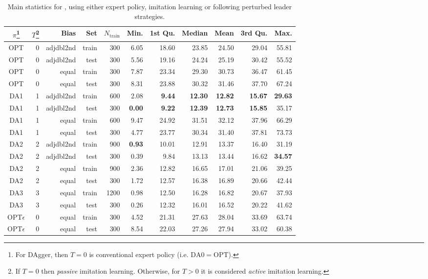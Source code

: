 \begin{table}[t]
\caption{Main statistics for  \namerho, using either expert
   policy, imitation learning or following perturbed leader 
   strategies.}\label{tbl:IL:stats} 
\noindent
\begin{minipage}{\textwidth}
\centering
\footnotesize
\begin{tabular}{c@{}rrrrrrrrrr}
  \toprule
  $\pi$\footnote{For DAgger, then $T=0$ is conventional expert policy (i.e. 
  $\text{DA}0=\text{OPT}$).}
  & $T$\footnote{If $T=0$ then \emph{passive} imitation learning. 
  Otherwise, for $T>0$ it is considered \emph{active} imitation learning.}
  & Bias & Set & $N_{\text{train}}$ & Min. & 1st Qu. & Median & 
  Mean & 3rd Qu. & Max. \\ 
  \midrule  
  OPT & 0 & adjdbl2nd & train & 300 & 6.05 & 18.60 & 23.85 & 24.50 & 
  29.04 & 55.81 \\ 
  OPT & 0 & adjdbl2nd & test & 300 & 5.56 & 19.16 & 24.24 & 25.19 & 
  30.42 & 55.52 \\ 
  OPT & 0 & equal & train & 300 & 7.87 & 23.34 & 29.30 & 30.73 & 36.47 & 
  61.45 \\ 
  OPT & 0 & equal & test & 300 & 8.31 & 23.88 & 30.32 & 31.46 & 37.70 & 
  67.24 \\ 
  DA1 & 1 & adjdbl2nd & train & 600 & 2.08 & \textbf{9.44} & \textbf{12.30} & 
  \textbf{12.82} & \textbf{15.67} & \textbf{29.63} \\ 
  DA1 & 1 & adjdbl2nd & test & 300 & \textbf{0.00} & \textbf{9.22} & 
  \textbf{12.39} & \textbf{12.73} & \textbf{15.85} & 35.17 \\ 
  DA1 & 1 & equal & train & 600 & 9.47 & 24.92 & 31.51 & 32.12 & 37.96 & 
  66.29 \\ 
  DA1 & 1 & equal & test & 300 & 4.77 & 23.77 & 30.34 & 31.40 & 37.81 & 
  73.73 \\ 
  DA2 & 2 & adjdbl2nd & train & 900 & \textbf{0.93} & 10.01 & 12.91 & 13.37 & 
  16.40 & 31.19 \\ 
  DA2 & 2 & adjdbl2nd & test & 300 & 0.39 & 9.84 & 13.13 & 13.44 & 16.62 
  & \textbf{34.57} \\ 
  DA2 & 2 & equal & train & 900 & 2.36 & 12.82 & 16.65 & 17.01 & 21.06 & 
  39.25 \\ 
  DA2 & 2 & equal & test & 300 & 1.72 & 12.57 & 16.38 & 16.89 & 20.66 & 
  42.44 \\ 
  DA3 & 3 & equal & train & 1200 & 0.98 & 12.50 & 16.28 & 16.82 & 20.67 & 
  37.93 \\ 
  DA3 & 3 & equal & test & 300 & 0.26 & 12.32 & 16.01 & 16.52 & 20.22 & 
  41.62 \\ 
  \midrule
  OPT$\epsilon$ & 0 & equal & train & 300 & 4.52 & 21.31 & 27.63 & 28.04 & 
  33.69 & 63.74 \\ 
  OPT$\epsilon$ & 0 & equal & test & 300 & 8.54 & 22.03 & 27.26 & 27.94 & 33.02 
  & 60.38 \\ 
  \bottomrule
\end{tabular}
\end{minipage}
\end{table}